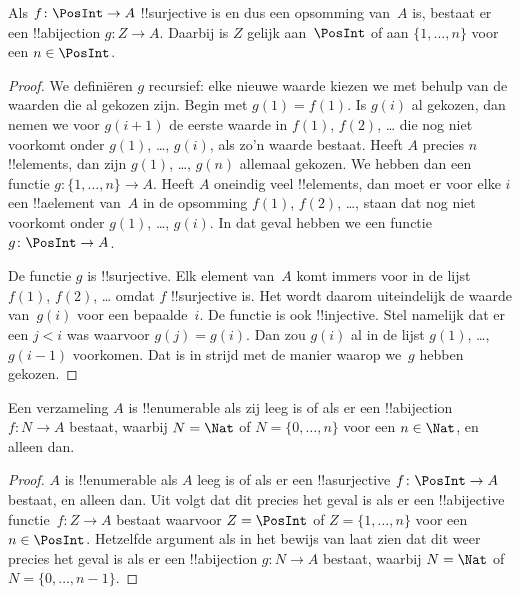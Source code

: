 \documentclass[../../../include/open-logic-section]{subfiles}
\begin{document}
\begin{prop}
Als $f\colon \PosInt \to A$ !!{surjective} is en dus een opsomming
van~$A$ is, bestaat er een !!a{bijection} $g\colon Z \to A$. Daarbij
is $Z$ gelijk aan~$\PosInt$ of aan $\{1, \dots, n\}$ voor een
$n \in \PosInt$.
\end{prop}

\begin{proof}
  We definiëren $g$ recursief: elke nieuwe waarde kiezen we met behulp
  van de waarden die al gekozen zijn. Begin met
  $g(1) = f(1)$. Is $g(i)$ al gekozen, dan nemen we voor $g(i+1)$ de
  eerste waarde in $f(1)$, $f(2)$, \dots{} die nog niet voorkomt onder
  $g(1)$, \dots, $g(i)$, als zo'n waarde bestaat. Heeft $A$ precies $n$
  !!{element}s, dan zijn $g(1)$, \dots, $g(n)$ allemaal gekozen. We
  hebben dan een functie $g\colon \{1, \dots, n\} \to A$. Heeft $A$
  oneindig veel !!{element}s, dan moet er voor elke $i$ een
  !!a{element} van~$A$ in de opsomming $f(1)$, $f(2)$, \dots, staan dat
  nog niet voorkomt onder $g(1)$, \dots, $g(i)$. In dat geval hebben we
  een functie $g\colon \PosInt \to A$.
  
  De functie $g$ is !!{surjective}. Elk element van~$A$ komt immers voor
  in de lijst $f(1)$, $f(2)$, \dots{} omdat $f$ !!{surjective} is. Het wordt
  daarom uiteindelijk de waarde van~$g(i)$ voor een bepaalde~$i$.
  De functie is ook !!{injective}. Stel namelijk dat er een $j < i$
  was waarvoor $g(j) = g(i)$. Dan zou $g(i)$ al in de lijst $g(1)$, \dots,
  $g(i-1)$ voorkomen. Dat is in strijd met de manier waarop we~$g$ hebben
  gekozen.
\end{proof}

\begin{cor}
Een verzameling $A$ is !!{enumerable} als zij leeg is of als er een
!!a{bijection} $f\colon N \to A$ bestaat, waarbij $N = \Nat$ of
$N = \{0, \dots, n\}$ voor een $n \in \Nat$, en alleen dan.
\end{cor}

\begin{proof}
$A$ is !!{enumerable} als $A$ leeg is of als er een !!a{surjective}
$f\colon \PosInt \to A$ bestaat, en alleen dan. Uit
 volgt dat dit precies het geval is als er een
!!a{bijective} functie~$f\colon Z \to A$ bestaat waarvoor $Z =
\PosInt$ of $Z = \{1, \dots, n\}$ voor een $n \in \PosInt$. Hetzelfde
argument als in het bewijs van  laat zien dat
dit weer precies het geval is als er een !!a{bijection}
$g\colon N \to A$ bestaat, waarbij $N = \Nat$ of
$N = \{0, \dots, n-1\}$.
\end{proof}
\end{document}
